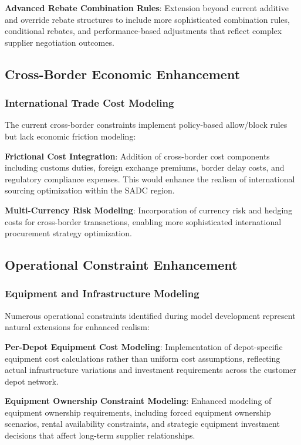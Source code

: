 \textbf{Advanced Rebate Combination Rules}: Extension beyond current additive and override rebate structures to include more sophisticated combination rules, conditional rebates, and performance-based adjustments that reflect complex supplier negotiation outcomes.

\subsection{Cross-Border Economic Enhancement}

\subsubsection{International Trade Cost Modeling}
The current cross-border constraints implement policy-based allow/block rules but lack economic friction modeling:

\textbf{Frictional Cost Integration}: Addition of cross-border cost components including customs duties, foreign exchange premiums, border delay costs, and regulatory compliance expenses. This would enhance the realism of international sourcing optimization within the SADC region.

\textbf{Multi-Currency Risk Modeling}: Incorporation of currency risk and hedging costs for cross-border transactions, enabling more sophisticated international procurement strategy optimization.

\subsection{Operational Constraint Enhancement}

\subsubsection{Equipment and Infrastructure Modeling}
Numerous operational constraints identified during model development represent natural extensions for enhanced realism:

\textbf{Per-Depot Equipment Cost Modeling}: Implementation of depot-specific equipment cost calculations rather than uniform cost assumptions, reflecting actual infrastructure variations and investment requirements across the customer depot network.

\textbf{Equipment Ownership Constraint Modeling}: Enhanced modeling of equipment ownership requirements, including forced equipment ownership scenarios, rental availability constraints, and strategic equipment investment decisions that affect long-term supplier relationships.

